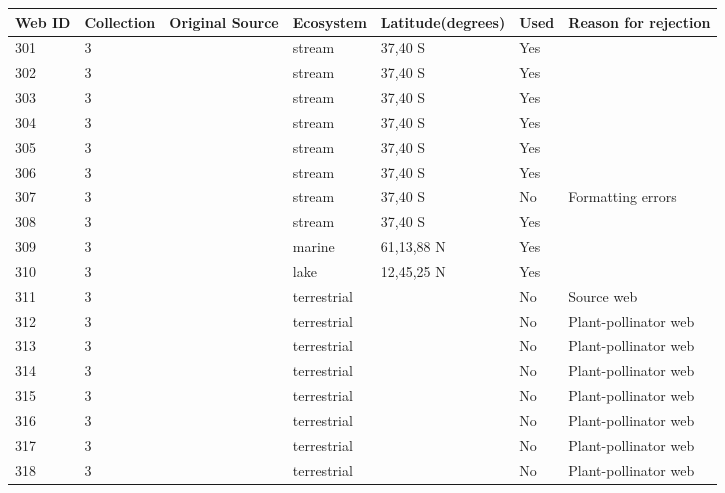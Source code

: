 \documentclass[12pt]{article}
\begin{document}
\begin{landscape}
    \begin{table}[h!]
    \centering
    {\footnotesize
      \begin{tabular}{p{2.8cm}p{1.3cm}p{3cm}p{2.2cm}p{2.5cm}lp{8.2cm}}
        \hline
        Web ID & Collection & Original Source & Ecosystem & Latitude(degrees) & Used  & Reason for rejection  \\
        \hline
        301   & 3 & \cite{Closs1994}  & stream & 37,40 S & Yes   &       \\
        302   & 3 & \cite{Closs1994}  & stream & 37,40 S & Yes   &       \\
        303   & 3 & \cite{Closs1994}  & stream & 37,40 S & Yes   &       \\
        304   & 3 & \cite{Closs1994}  & stream & 37,40 S & Yes   &       \\
        305   & 3 & \cite{Closs1994}  & stream & 37,40 S & Yes   &       \\
        306   & 3 & \cite{Closs1994}  & stream & 37,40 S & Yes   &       \\
        307   & 3 & \cite{Closs1994}  & stream & 37,40 S & No  &  Formatting errors     \\
        308   & 3 & \cite{Closs1994}  & stream & 37,40 S & Yes   &       \\
        309   & 3 & \cite{Gontikaki2011}  & marine & 61,13,88 N & Yes   &       \\
        310   & 3 & \cite{Khan2009}  & lake  & 12,45,25 N & Yes   &       \\
        311   & 3 & \cite{Memmott2000}     & terrestrial &       & No    & Source web \\
        312   & 3 & \cite{Kaiser-Bunbury2009}  & terrestrial &       & No    & Plant-pollinator web \\
        313   & 3 & \cite{Kaiser-Bunbury2009}  & terrestrial &       & No    & Plant-pollinator web \\
        314   & 3 & \cite{Kaiser-Bunbury2011}  & terrestrial &       & No    & Plant-pollinator web \\
        315   & 3 & \cite{Kaiser-Bunbury2011}  & terrestrial &       & No    & Plant-pollinator web \\
        316   & 3 & \cite{Kaiser-Bunbury2011}  & terrestrial &       & No    & Plant-pollinator web \\
        317   & 3 & \cite{Kaiser-Bunbury2011}  & terrestrial &       & No    & Plant-pollinator web \\
        318   & 3 & \cite{Kaiser-Bunbury2011}  & terrestrial &       & No    & Plant-pollinator web \\

\end{tabular}}
\end{table}
\end{landscape}
\end{document}
